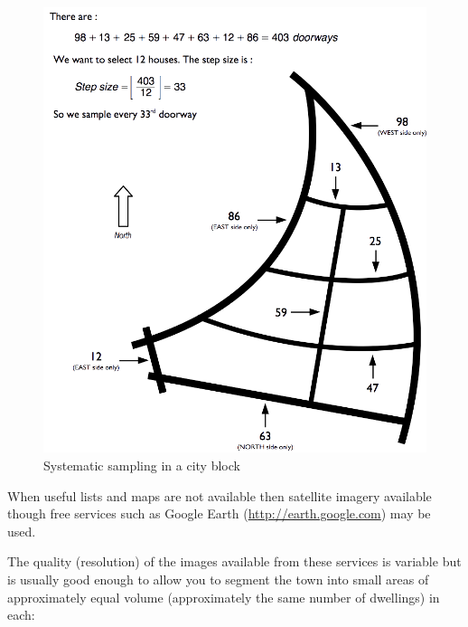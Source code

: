 \documentclass[12pt,a4paper]{book}
\theoremstyle{definition}
\theoremstyle{definition}
\theoremstyle{definition}
\theoremstyle{remark}
\begin{document}
\begin{figure}[H]

{\centering \includegraphics{figures/stage2sample13} 

}

\caption{Systematic sampling in a city block}\label{fig:sample27}
\end{figure}

When useful lists and maps are not available then satellite imagery
available though free services such as Google Earth
(\url{http://earth.google.com}) may be used.

The quality (resolution) of the images available from these services is
variable but is usually good enough to allow you to segment the town
into small areas of approximately equal volume (approximately the same
number of dwellings) in each:
\end{document}
